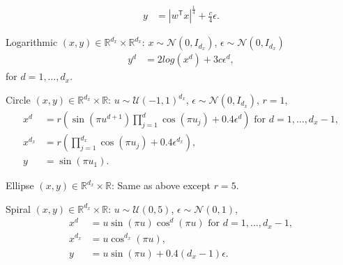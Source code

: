 \documentclass[11pt]{article}
\newcommand{\T}{^{\ensuremath{\mathsf{T}}}}           %
\providecommand{\mc}[1]{\mathcal{#1}}
\newcommand{\Real}{\mathbb{R}}
\begin{document}
\begin{compactenum}
\begin{align*}
y&=|w\T x|^\frac{1}{4}+\frac{c}{4}\epsilon.
\end{align*}
\item Logarithmic $(x,y) \in \Real^{d_{x}} \times \Real^{d_{x}}$: $x \sim \mc{N}(0, I_{d_{x}})$, $\epsilon \sim \mc{N}(0, I_{d_{x}})$
\begin{align*}
y^{d}&=2log(x^{d})+3c\epsilon^{d},
\end{align*}
for $d=1,\ldots,d_{x}$.
\item Circle $(x,y) \in \Real^{d_{x}} \times \Real$: $u \sim \mc{U}(-1,1)^{d_{x}}$, $\epsilon \sim \mc{N}(0, I_{d_{x}})$, $r=1$,
\begin{align*}
x^{d}&=r \left(\sin(\pi u^{d+1})  \prod_{j=1}^{d} \cos(\pi u_{j})+0.4 \epsilon^{d}\right) \mbox{ for $d=1,\ldots,d_{x}-1$},\\
x^{d_{x}}&=r \left(\prod_{j=1}^{d_{x}} \cos(\pi u_{j})+0.4 \epsilon^{d_{x}}\right),\\
y&= \sin(\pi u_{1}).
\end{align*}
\item Ellipse $(x,y) \in \Real^{d_{x}} \times \Real$: Same as above except $r=5$.

\item Spiral $(x,y) \in \Real^{d_{x}} \times \Real$: $u \sim \mc{U}(0,5)$, $\epsilon \sim \mc{N}(0, 1)$, 
\begin{align*}
x^{d}&=u \sin(\pi u)  \cos^{d}(\pi u) \mbox{ for $d=1,\ldots,d_{x}-1$},\\
x^{d_{x}}&=u \cos^{d_{x}}(\pi u),\\
y&= u \sin(\pi u) +0.4 (d_{x}-1)\epsilon.
\end{align*}


\end{compactenum}
\end{document}
